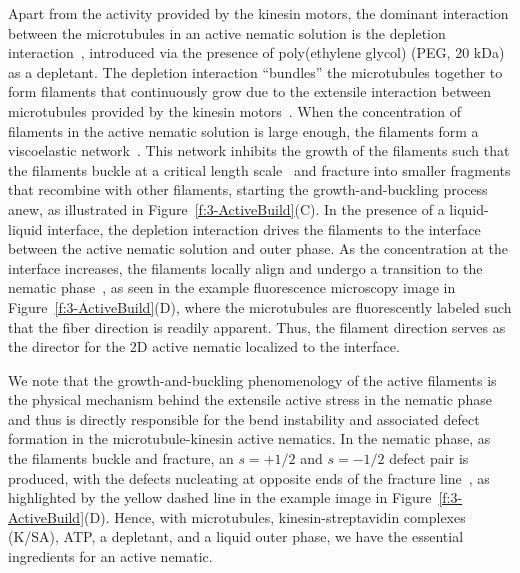 Apart from the activity provided by the kinesin motors, the dominant interaction between the microtubules in an active nematic solution is the depletion interaction~\cite{RN251}, introduced via the presence of poly(ethylene glycol) (PEG, 20 kDa) as a depletant.
The depletion interaction ``bundles'' the microtubules together to form filaments that continuously grow due to the extensile interaction between microtubules provided by the kinesin motors~\cite{RN244,RN4,RN3}.
When the concentration of filaments in the active nematic solution is large enough, the filaments form a viscoelastic network~\cite{RN253,RN3}.
This network inhibits the growth of the filaments such that the filaments buckle at a critical length scale~\cite{RN253,RN3} and fracture into smaller fragments that recombine with other filaments, starting the growth-and-buckling process anew, as illustrated in Figure~\ref{f:3-ActiveBuild}(C).
In the presence of a liquid-liquid interface, the depletion interaction drives the filaments to the interface between the active nematic solution and outer phase.
As the concentration at the interface increases, the filaments locally align and undergo a transition to the nematic phase~\cite{RN3,RN135,RN134}, as seen in the example fluorescence microscopy image in Figure~\ref{f:3-ActiveBuild}(D), where the microtubules are fluorescently labeled such that the fiber direction is readily apparent.
Thus, the filament direction serves as the director for the 2D active nematic localized to the interface.

We note that the growth-and-buckling phenomenology of the active filaments is the physical mechanism behind the extensile active stress in the nematic phase and thus is directly responsible for the bend instability and associated defect formation in the microtubule-kinesin active nematics.
In the nematic phase, as the filaments buckle and fracture, an $s = +1/2$ and $s = -1/2$ defect pair is produced, with the defects nucleating at opposite ends of the fracture line~\cite{RN3,RN11}, as highlighted by the yellow dashed line in the example image in Figure~\ref{f:3-ActiveBuild}(D).
Hence, with microtubules, kinesin-streptavidin complexes (K/SA), ATP, a depletant, and a liquid outer phase, we have the essential ingredients for an active nematic.

